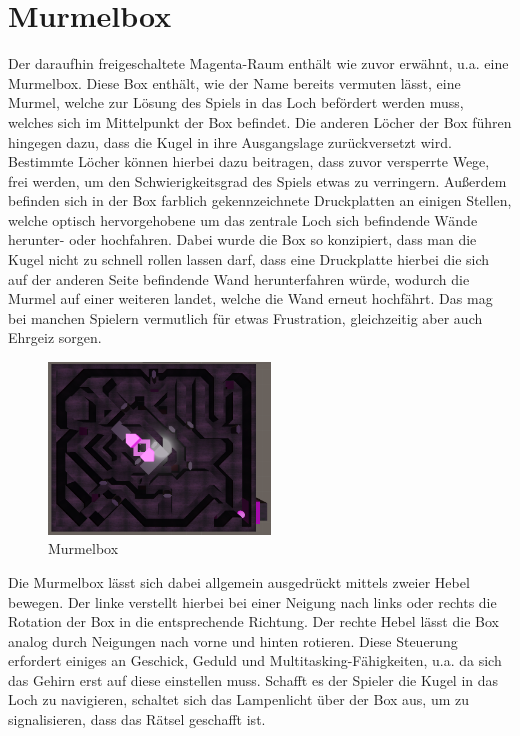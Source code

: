 \section{Murmelbox}
Der daraufhin freigeschaltete Magenta-Raum enthält wie zuvor erwähnt, u.a. eine Murmelbox. Diese Box enthält, wie der Name bereits vermuten lässt, eine Murmel, welche zur Lösung des Spiels in das Loch befördert werden muss, welches sich im Mittelpunkt der Box befindet. Die anderen Löcher der Box führen hingegen dazu, dass die Kugel in ihre Ausgangslage zurückversetzt wird. Bestimmte Löcher können hierbei dazu beitragen, dass zuvor versperrte Wege, frei werden, um den Schwierigkeitsgrad des Spiels etwas zu verringern. Außerdem befinden sich in der Box farblich gekennzeichnete Druckplatten an einigen Stellen, welche optisch hervorgehobene um das zentrale Loch sich befindende Wände herunter- oder hochfahren. Dabei wurde die Box so konzipiert, dass man die Kugel nicht zu schnell rollen lassen darf, dass eine Druckplatte hierbei die sich auf der anderen Seite befindende Wand herunterfahren würde, wodurch die Murmel auf einer weiteren landet, welche die Wand erneut hochfährt. Das mag bei manchen Spielern vermutlich für etwas Frustration, gleichzeitig aber auch Ehrgeiz sorgen.\\
\begin{figure}
	\vspace*{-0.5cm}
	\includegraphics[width=5.9cm]{Pictures/Murmelbox}
	\caption{Murmelbox}
	\vspace*{-0.5cm}
	\label{fig:murmelbox}
\end{figure}
Die Murmelbox lässt sich dabei allgemein ausgedrückt mittels zweier Hebel bewegen. Der linke verstellt hierbei bei einer Neigung nach links oder rechts die Rotation der Box in die entsprechende Richtung. Der rechte Hebel lässt die Box analog durch Neigungen nach vorne und hinten rotieren. Diese Steuerung erfordert einiges an Geschick, Geduld und Multitasking-Fähigkeiten, u.a. da sich das Gehirn erst auf diese einstellen muss. Schafft es der Spieler die Kugel in das Loch zu navigieren, schaltet sich das Lampenlicht über der Box aus, um zu signalisieren, dass das Rätsel geschafft ist.
